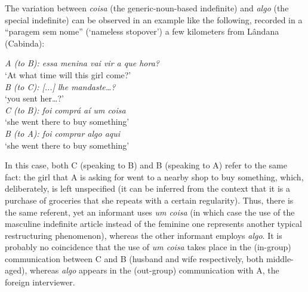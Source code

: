\documentclass[output=paper,colorlinks,citecolor=brown]{langscibook}
\begin{document}
The variation between \textit{coisa} (the generic-noun-based indefinite) and \textit{algo} (the special indefinite) can be observed in an example like the following, recorded in a “paragem sem nome” (‘nameless stopover’) a few kilometers from Lândana (Cabinda):

\ea \label{ex:gut39}
    \textit{A (to B): essa menina vai vir a que hora?}\\
    ‘At what time will this girl come?’\\
    \textit{B (to C): [...] lhe mandaste…?}\\
    ‘you sent her…?’\\
    \textit{C (to B): foi comprá aí um coisa}\\
    ‘she went there to buy something’\\
    \textit{B (to A): foi comprar algo aqui}\\
    ‘she went there to buy something’
\z

In this case, both C (speaking to B) and B (speaking to A) refer to the same fact: the girl that A is asking for went to a nearby shop to buy something, which, deliberately, is left unspecified (it can be inferred from the context that it is a purchase of groceries that she repeats with a certain regularity). Thus, there is the same referent, yet an informant uses \textit{um coisa} (in which case the use of the masculine indefinite article instead of the feminine one represents another typical restructuring phenomenon), whereas the other informant employs \textit{algo}. It is probably no coincidence that the use of \textit{um coisa} takes place in the (in-group) communication between C and B (husband and wife respectively, both middle-aged), whereas \textit{algo} appears in the (out-group) communication with A, the foreign interviewer.\largerpage
\end{document}
